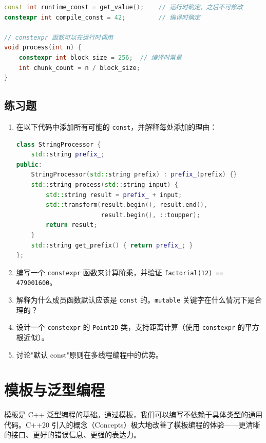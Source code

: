 \begin{lstlisting}[language=C++]
const int runtime_const = get_value();    // 运行时确定，之后不可修改
constexpr int compile_const = 42;         // 编译时确定

// constexpr 函数可以在运行时调用
void process(int n) {
    constexpr int block_size = 256;  // 编译时常量
    int chunk_count = n / block_size;
}
\end{lstlisting}

\section*{练习题}

\begin{enumerate}
  \item 在以下代码中添加所有可能的 \texttt{const}，并解释每处添加的理由：
\begin{lstlisting}[language=C++]
class StringProcessor {
    std::string prefix_;
public:
    StringProcessor(std::string prefix) : prefix_(prefix) {}
    std::string process(std::string input) {
        std::string result = prefix_ + input;
        std::transform(result.begin(), result.end(),
                       result.begin(), ::toupper);
        return result;
    }
    std::string get_prefix() { return prefix_; }
};
\end{lstlisting}
  \item 编写一个 \texttt{constexpr} 函数来计算阶乘，并验证 \texttt{factorial(12) == 479001600}。
  \item 解释为什么成员函数默认应该是 \texttt{const} 的。\texttt{mutable} 关键字在什么情况下是合理的？
  \item 设计一个 \texttt{constexpr} 的 \texttt{Point2D} 类，支持距离计算（使用 \texttt{constexpr} 的平方根近似）。
  \item 讨论"默认 const"原则在多线程编程中的优势。
\end{enumerate}


\chapter{模板与泛型编程}

模板是 C++ 泛型编程的基础。通过模板，我们可以编写不依赖于具体类型的通用代码。C++20 引入的概念（Concepts）极大地改善了模板编程的体验——更清晰的接口、更好的错误信息、更强的表达力。

